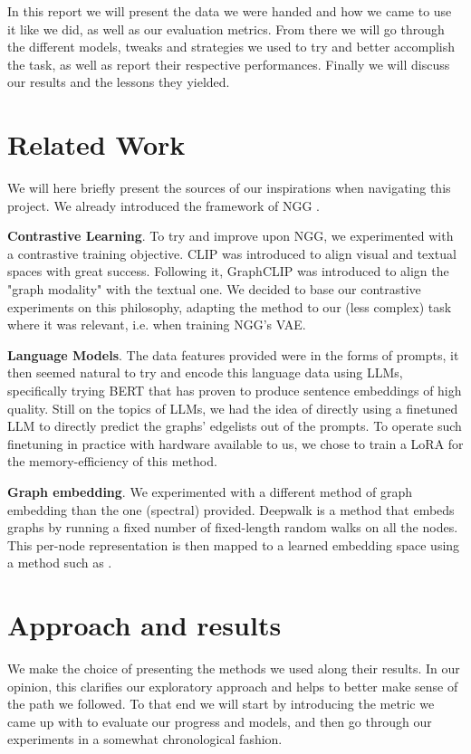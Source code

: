 \documentclass[10pt,twocolumn,letterpaper]{article}
\begin{document}
In this report we will present the data we were handed and how we came to use it like we did, as well as our evaluation metrics. From there we will go through the different models, tweaks and strategies we used to try and better accomplish the task, as well as report their respective performances. Finally we will discuss our results and the lessons they yielded.

\section{Related Work}
\label{sec:related_work}
We will here briefly present the sources of our inspirations when navigating this project. We already introduced the framework of NGG \cite{evdaimon2024neuralgraphgeneratorfeatureconditioned}.

\noindent
\textbf{Contrastive Learning}. To try and improve upon NGG, we experimented with a contrastive training objective. CLIP \cite{CLIP} was introduced to align visual and textual spaces with great success. Following it, GraphCLIP \cite{graphCLIP} was introduced to align the "graph modality" with the textual one. We decided to base our contrastive experiments on this philosophy, adapting the method to our (less complex) task where it was relevant, i.e. when training NGG's VAE.

\medskip
\noindent
\textbf{Language Models}. The data features provided were in the forms of prompts, it then seemed natural to try and encode this language data using LLMs, specifically trying BERT \cite{bert} that has proven to produce sentence embeddings of high quality. Still on the topics of LLMs, we had the idea of directly using a finetuned LLM to directly predict the graphs' edgelists out of the prompts. To operate such finetuning in practice with hardware available to us, we chose to train a LoRA \cite{lora} for the memory-efficiency of this method. 

\noindent
\textbf{Graph embedding}. We experimented with a different method of graph embedding than the one (spectral) provided. Deepwalk \cite{deepwalk} is a method that embeds graphs by running a fixed number of fixed-length random walks on all the nodes. This per-node representation is then mapped to a learned embedding space using a method such as \cite{word2vec}. 

\section{Approach and results}
\label{sec:approach_results}
We make the choice of presenting the methods we used along their results. In our opinion, this clarifies our exploratory approach and helps to better make sense of the path we followed. To that end we will start by introducing the metric we came up with to evaluate our progress and models, and then go through our experiments in a somewhat chronological fashion.
\end{document}
